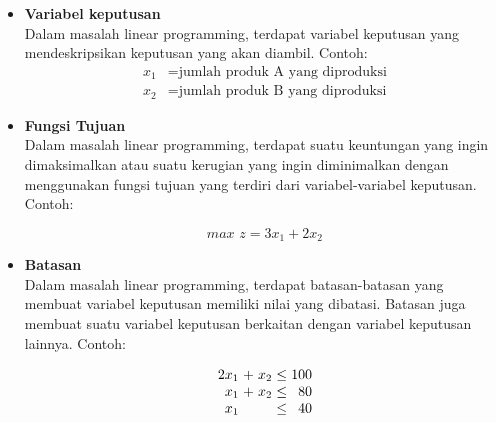 \begin{itemize}
	\item \textbf{Variabel keputusan}\\
		Dalam masalah linear programming, terdapat variabel keputusan yang mendeskripsikan keputusan yang akan diambil. Contoh:
		\begin{equation*}
			\begin{split}
				x_1 &= \text{jumlah produk A yang diproduksi} \\
    			x_2 &= \text{jumlah produk B yang diproduksi}
			\end{split}
		\end{equation*}
		
	\item \textbf{Fungsi Tujuan}\\
		Dalam masalah linear programming, terdapat suatu keuntungan yang ingin dimaksimalkan atau suatu kerugian yang ingin diminimalkan dengan menggunakan  fungsi tujuan yang terdiri dari variabel-variabel keputusan. Contoh:
		
		\begin{equation*}
			\textit{max } z = 3x_1 + 2x_2
		\end{equation*}

	\item \textbf{Batasan}\\
		Dalam masalah linear programming, terdapat batasan-batasan yang membuat variabel keputusan memiliki nilai yang dibatasi. Batasan juga membuat suatu variabel keputusan berkaitan dengan variabel keputusan lainnya. Contoh:

		\begin{equation*}		
			\setlength\arraycolsep{1.5pt}
			\begin{array}{r c r c r}
				2x_1 & + & x_2 & \leq & 100 \\
    			x_1 & + & x_2 & \leq & 80 \\
    			x_1 & & & \leq & 40
			\end{array}
		\end{equation*}
		

\end{itemize}
